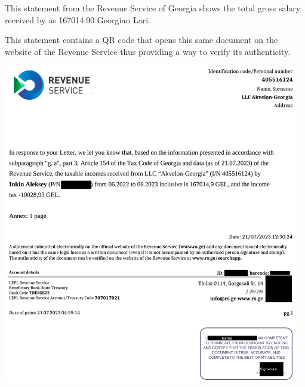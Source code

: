 
This statement from the Revenue Service of Georgia shows the total gross salary
received by \mrl as 167014.90 Georgian Lari.

This statement contains a QR code that opens this same document on the website
of the Revenue Service thus providing a way to verify its authenticity.

\begin{center}
    \includegraphics[width=35em]{rs-1_en_public}
\end{center}



